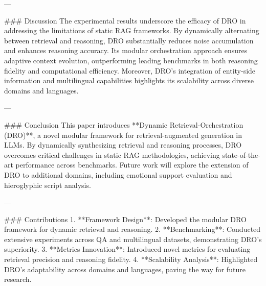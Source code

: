 ---

### Discussion  
The experimental results underscore the efficacy of DRO in addressing the limitations of static RAG frameworks. By dynamically alternating between retrieval and reasoning, DRO substantially reduces noise accumulation and enhances reasoning accuracy. Its modular orchestration approach ensures adaptive context evolution, outperforming leading benchmarks in both reasoning fidelity and computational efficiency. Moreover, DRO's integration of entity-side information and multilingual capabilities highlights its scalability across diverse domains and languages.

---

### Conclusion  
This paper introduces **Dynamic Retrieval-Orchestration (DRO)**, a novel modular framework for retrieval-augmented generation in LLMs. By dynamically synthesizing retrieval and reasoning processes, DRO overcomes critical challenges in static RAG methodologies, achieving state-of-the-art performance across benchmarks. Future work will explore the extension of DRO to additional domains, including emotional support evaluation and hieroglyphic script analysis.

---

### Contributions  
1. **Framework Design**: Developed the modular DRO framework for dynamic retrieval and reasoning.  
2. **Benchmarking**: Conducted extensive experiments across QA and multilingual datasets, demonstrating DRO's superiority.  
3. **Metrics Innovation**: Introduced novel metrics for evaluating retrieval precision and reasoning fidelity.  
4. **Scalability Analysis**: Highlighted DRO's adaptability across domains and languages, paving the way for future research.

